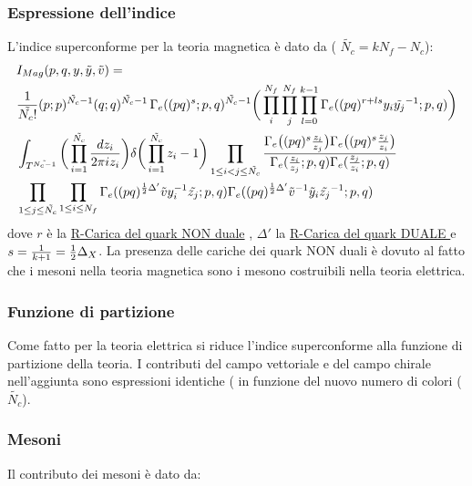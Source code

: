 \documentclass[a4paper,12pt]{article}
\begin{document}
\subsubsection{Espressione dell'indice}
L'indice superconforme per la teoria magnetica è dato da ( $\tilde{N_c} = k N_f - N_c$):
\begin{align*}
&I_{Mag} ( p,q,y,\tilde y,\tilde v) = \\
 & { 1 \over \tilde{N_c !}} (p;p)^{\tilde{N_c}-1} ( q;q)^{\tilde{N_c}-1} \, \Gamma_e( (pq)^s;p,q)^{\tilde{N_c}-1} \bigg( \prod_i^{N_f} \prod_j^{N_f}  \prod_{l=0}^{k-1} \Gamma_e ( (pq)^{r + l s} y_i \tilde{y_j}^{-1}; p ,q) \bigg) \\
&\int_{T^{\tilde{N_c-1}}} \bigg( \prod_{i=1}^{ \tilde{N_c }} { d z_i \over { 2 \pi i z_i} } \bigg) \delta \bigg( \prod_{i=1}^{\tilde{N_c}} z_i - 1 \bigg) 
\prod_{ 1 \leq i < j \leq \tilde{N_c}} \frac{ \Gamma_e \big( (pq)^s {z_i \over z_j} \big) \Gamma_e \big( (pq)^s {z_j \over z_i} \big) }{ \Gamma_e( {z_i \over z_j};p,q) \Gamma_e({z_j \over z_i}; p,q)} \\
& \prod_{ 1 \leq j \leq \tilde{N_c}} \prod_{ 1 \leq i \leq N_f} \Gamma_e ( (pq)^{{1 \over 2 } \Delta'} \tilde{v} y_i^{-1} \tilde{z_j} ; p,q)\Gamma_e ( (pq)^{{1 \over 2 } \Delta'} \tilde{v}^{-1} \tilde y_i \tilde{z_j}^{-1} ; p,q)
\end{align*}
dove $r $ è la \underline{R-Carica del quark NON duale} , $\Delta'$ la \underline{R-Carica del quark DUALE } e $ s = \frac{1}{k+1} = {1 \over 2 } \Delta_X$.
La presenza delle cariche dei quark NON duali è dovuto al fatto che i mesoni nella teoria magnetica sono i mesono costruibili nella teoria elettrica.

\subsubsection{Funzione di partizione}
Come fatto per la teoria elettrica si riduce l'indice superconforme alla funzione di partizione della teoria.
I contributi del campo vettoriale e del campo chirale nell'aggiunta sono espressioni identiche ( in funzione del nuovo numero di colori ($\tilde{N_c}$).\\
\subsubsection*{Mesoni}
Il contributo dei mesoni è dato da:
\end{document}
